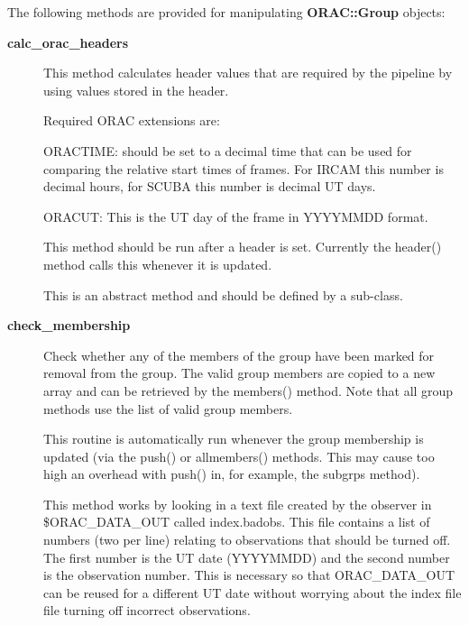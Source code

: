 The following methods are provided for manipulating \textbf{ORAC::Group}
objects:

\begin{description}
\item[\textbf{calc\_orac\_headers}] \mbox{}

This method calculates header values that are required by the
pipeline by using values stored in the header.



Required ORAC extensions are:



ORACTIME: should be set to a decimal time that can be used for
comparing the relative start times of frames. For IRCAM this
number is decimal hours, for SCUBA this number is decimal
UT days.



ORACUT: This is the UT day of the frame in YYYYMMDD format.



This method should be run after a header is set. Currently the header()
method calls this whenever it is updated.



This is an abstract method and should be defined by a sub-class.

\item[\textbf{check\_membership}] \mbox{}

Check whether any of the members of the group have been marked for
removal from the group. The valid group members are copied
to a new array and can be retrieved by the members() method.
Note that all group methods use the list of valid group
members.



This routine is automatically run whenever the group membership
is updated (via the push() or  allmembers() methods. This may
cause too high an overhead with push() in, for example, the
subgrps method).



This method works by looking in a text file created by the
observer in \$ORAC\_DATA\_OUT called index.badobs. This file
contains a list of numbers (two per line) relating to observations
that should be turned off. The first number is the UT date
(YYYYMMDD) and the second number is the observation
number. This is necessary so that ORAC\_DATA\_OUT can be reused
for a different UT date without worrying about the index file
file turning off incorrect observations.




\end{description}
